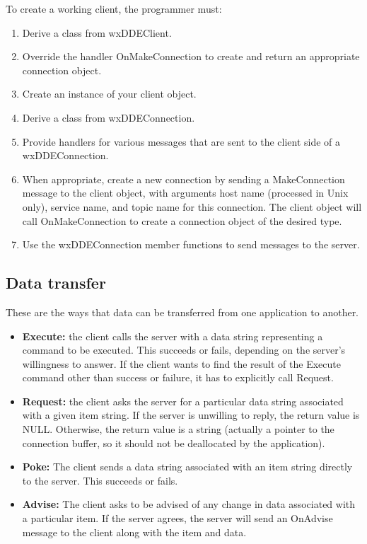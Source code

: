 To create a working client, the programmer must:

\begin{enumerate}\itemsep=0pt
\item Derive a class from wxDDEClient.
\item Override the handler OnMakeConnection to create and return
an appropriate connection object.
\item Create an instance of your client object.
\item Derive a class from wxDDEConnection.
\item Provide handlers for various messages that are sent to the client
side of a wxDDEConnection.
\item When appropriate, create a new connection by sending a MakeConnection
message to the client object, with arguments host name (processed in Unix only),
service name, and topic name for this connection. The client object will call OnMakeConnection
to create a connection object of the desired type.
\item Use the wxDDEConnection member functions to send messages to the server.
\end{enumerate}

\subsection{Data transfer}

These are the ways that data can be transferred from one application to
another.

\begin{itemize}\itemsep=0pt
\item {\bf Execute:} the client calls the server with a data string representing
a command to be executed. This succeeds or fails, depending on the
server's willingness to answer. If the client wants to find the result
of the Execute command other than success or failure, it has to explicitly
call Request.
\item {\bf Request:} the client asks the server for a particular data string
associated with a given item string. If the server is unwilling to
reply, the return value is NULL. Otherwise, the return value is a string
(actually a pointer to the connection buffer, so it should not be
deallocated by the application).
\item {\bf Poke:} The client sends a data string associated with an item
string directly to the server. This succeeds or fails.
\item {\bf Advise:} The client asks to be advised of any change in data
associated with a particular item. If the server agrees, the server will
send an OnAdvise message to the client along with the item and data.
\end{itemize}

